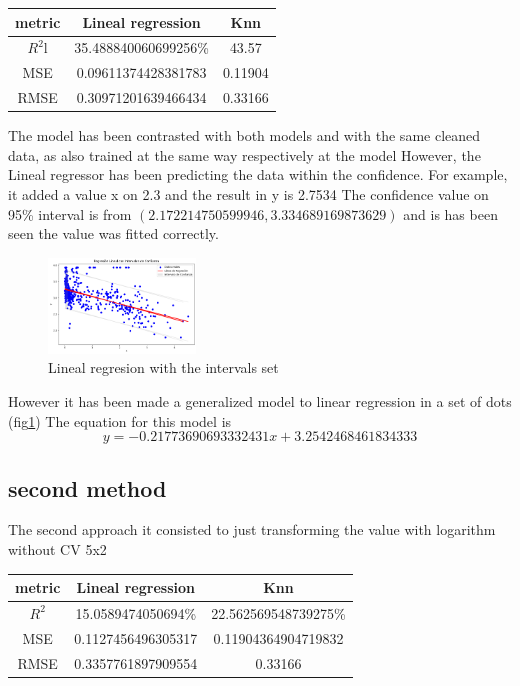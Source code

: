 \documentclass{article}
\begin{document}
\begin{center}
  \begin{tabular}{|c|c|c|}
    \hline
     metric & Lineal regression & Knn \\ \hline
     $R^2$l& 35.488840060699256\%&43.57\\
     MSE&0.09611374428381783&0.11904\\
     RMSE&0.30971201639466434&0.33166\\
     \hline
  \end{tabular}
\end{center}
The model has been contrasted with both models and with the same cleaned data, as also trained at the same way respectively at the model 
However, the Lineal regressor has been predicting the data within the confidence.
For example, it added a value x on 2.3 and the result in y is 2.7534 
The confidence value on 95\% interval is  from $(2.172214750599946, 3.334689169873629)$
and is has been seen the value was fitted correctly.
\begin{figure}[h]
  \includegraphics[width=0.35\textwidth]{data2_plot.png}
  \caption{Lineal regresion with the intervals set}

  \label{fig:example_intervals}
\end{figure}
However it has been made a generalized model to linear regression in a set of dots (fig\ref{fig:example_intervals})
The equation for this model is 
$$y=-0.21773690693332431x+3.2542468461834333$$
\subsection{second method}
The second approach it consisted to just transforming the value with logarithm without CV 5x2
\begin{center}
  \begin{tabular}{|c|c|c|}
    \hline
     metric & Lineal regression & Knn \\ \hline
     $R^2$& 15.0589474050694\%&22.562569548739275\%\\
     MSE&0.1127456496305317&0.11904364904719832\\
     RMSE&0.3357761897909554&0.33166\\
     \hline
  \end{tabular}
\end{center}
\end{document}
